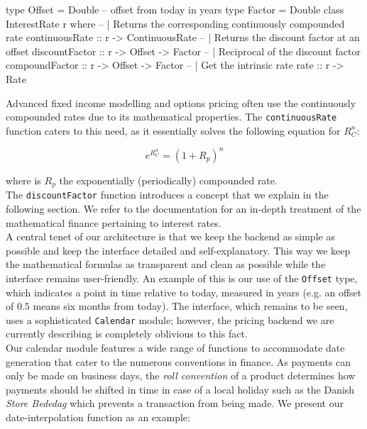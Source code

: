 \begin{hscode}
type Offset = Double -- offset from today in years
type Factor = Double
class InterestRate r where
  -- | Returns the corresponding continuously compounded rate
  continuousRate :: r -> ContinuousRate
  -- | Returns the discount factor at an offset
  discountFactor :: r -> Offset -> Factor 
  -- | Reciprocal of the discount factor
  compoundFactor :: r -> Offset -> Factor 
  -- | Get the intrinsic rate
  rate           :: r -> Rate
\end{hscode}

Advanced fixed income modelling and options 
pricing often use the continuously compounded rates due to its mathematical 
properties\cite{HULL}. The \texttt{continuousRate} function caters to this
need, as it essentially solves the following equation for $R_C^n$:

\begin{equation}
e^{R_C^n} = (1+R_p)^n
\end{equation}

where is $R_p$ the exponentially (periodically) compounded rate.\\

The \texttt{discountFactor} function introduces a concept that we
explain in the following section. We refer to the \hql documentation\cite{hqldoc}
for an in-depth treatment of the mathematical finance pertaining to interest
rates.\\

A central tenet of our architecture is that we keep the backend
as simple as possible and keep the interface detailed and 
self-explanatory. This way we keep the mathematical formulas as transparent
and clean as possible while the interface remains user-friendly. An example
of this is our use of the \texttt{Offset} type, which indicates a point in 
time relative to today, measured in years (e.g. an offset of $0.5$
means six months from today). The interface, which remains to be seen, uses
a sophisticated \texttt{Calendar} module; however, the pricing backend we
are currently describing is completely oblivious to this fact.\\

Our calendar module features a wide range of functions to accommodate date
generation that cater to the numerous conventions in finance. As payments
can only be made on business days, the \emph{roll convention} of a product
determines how payments should be shifted in time in case of a local
holiday such as the Danish \emph{Store Bededag} which prevents a transaction from
being made. We present our date-interpolation function as an example:

